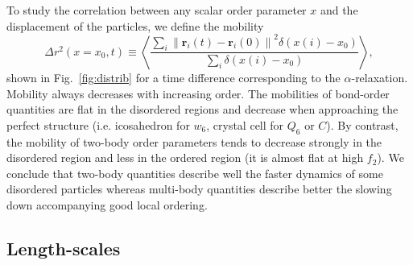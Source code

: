 \documentclass[twocolumn,superscriptaddress]{revtex4-1}
\begin{document}
To study the correlation between any scalar order parameter $x$ and the displacement of the particles, we define the mobility 
\begin{equation}
	\Delta r^2(x=x_0, t) \equiv \left\langle \frac{
		\sum\limits_i{
			\left\|\mathbf{r}_i(t)-\mathbf{r}_i(0)\right\|^2 \delta(x(i)-x_0)
			}
	}{
		\sum\limits_i{\delta(x(i)-x_0)}
	}\right\rangle,
	\label{eq:mobility}
\end{equation}
shown in Fig.~\ref{fig:distrib} for a time difference corresponding to the $\alpha$-relaxation. Mobility always decreases with increasing order. The mobilities of bond-order quantities are flat in the disordered regions and decrease when approaching the perfect structure (i.e. icosahedron for $w_6$, crystal cell for $Q_6$ or $C$). By contrast, the mobility of two-body order parameters tends to decrease strongly in the disordered region and less in the ordered region (it is almost flat at high $f_2$). We conclude that two-body quantities describe well the faster dynamics of some disordered particles whereas multi-body quantities describe better the slowing down accompanying good local ordering.

\subsection{Length-scales}
\end{document}
